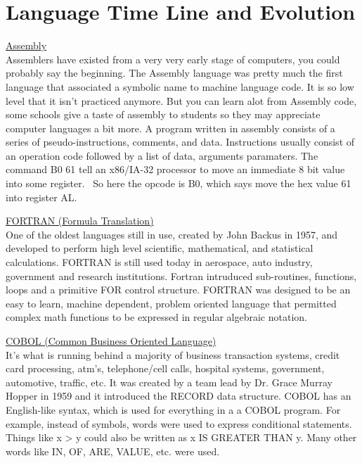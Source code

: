 \documentclass[letterpaper, 10 pt, conference]{IEEEtran}
\begin{document}
\section{Language Time Line and Evolution}
\noindent \underline{Assembly} \\
Assemblers have existed from a very very early stage of computers, you could probably say the beginning. The Assembly language was pretty much the first language that associated a symbolic name to machine language code. It is so low level that it isn't practiced anymore. But you can learn alot from Assembly code, some schools give a taste of assembly to students so they may appreciate computer languages a bit more. A program written in assembly consists of a series of pseudo-instructions, comments, and data. Instructions usually consist of an operation code followed by a list of data, arguments paramaters. The command B0 61 tell an x86/IA-32 processor to move an immediate 8 bit value into some register.~\cite{History} So here the opcode is B0, which says move the hex value 61 into register AL.\bigskip

\noindent \underline{FORTRAN (Formula Translation)} \\
One of the oldest languages still in use,  created by John Backus in 1957, and developed to perform high level scientific, mathematical, and statistical calculations. FORTRAN is still used today in aerospace, auto industry, government and research institutions. Fortran intruduced sub-routines, functions, loops and a primitive FOR control structure. FORTRAN was designed to be an easy to learn, machine dependent, problem oriented language that permitted complex math functions to be expressed in regular algebraic notation.\bigskip

\noindent \underline{COBOL (Common Business Oriented Language)}\\
It's what is running behind a majority of business transaction systems, credit card processing, atm's, telephone/cell calls, hospital systems, government, automotive, traffic, etc. It was created by a team lead by Dr. Grace Murray Hopper in 1959 and it introduced the RECORD data structure. COBOL has an English-like syntax, which is used for everything in a a COBOL program. For example, instead of symbols, words were used to express conditional statements. Things like x > y could also be written as x IS GREATER THAN y. Many other words like IN, OF, ARE, VALUE, etc. were used.\bigskip
\end{document}
